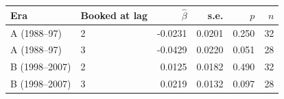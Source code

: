 \begin{tabular}{llrrrr}
\toprule
Era & Booked at lag & $\hat\beta$ & s.e. & $p$ & $n$ \\
\midrule
A (1988--97) & 2 & -0.0231 & 0.0201 & 0.250 & 32 \\
A (1988--97) & 3 & -0.0429 & 0.0220 & 0.051 & 28 \\
B (1998--2007) & 2 & 0.0125 & 0.0182 & 0.490 & 32 \\
B (1998--2007) & 3 & 0.0219 & 0.0132 & 0.097 & 28 \\
\bottomrule
\end{tabular}
